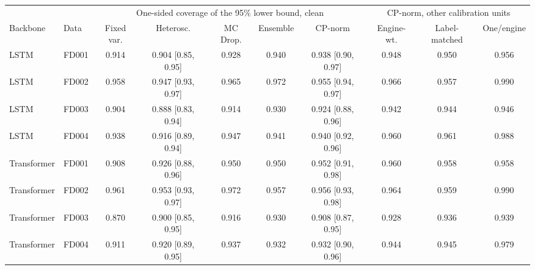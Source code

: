 \begin{tabular}{llcccccccc}\toprule
 & & \multicolumn{5}{c}{One-sided coverage of the 95\% lower bound, clean} & \multicolumn{3}{c}{CP-norm, other calibration units} \\
\cmidrule(lr){3-7}\cmidrule(lr){8-10}
Backbone & Data & Fixed var. & Heterosc. & MC Drop. & Ensemble & CP-norm & Engine-wt. & Label-matched & One/engine \\ \midrule
LSTM & FD001 & 0.914 & 0.904 [0.85, 0.95] & 0.928 & 0.940 & 0.938 [0.90, 0.97] & 0.948 & 0.950 & 0.956 \\
LSTM & FD002 & 0.958 & 0.947 [0.93, 0.97] & 0.965 & 0.972 & 0.955 [0.94, 0.97] & 0.966 & 0.957 & 0.990 \\
LSTM & FD003 & 0.904 & 0.888 [0.83, 0.94] & 0.914 & 0.930 & 0.924 [0.88, 0.96] & 0.942 & 0.944 & 0.946 \\
LSTM & FD004 & 0.938 & 0.916 [0.89, 0.94] & 0.947 & 0.941 & 0.940 [0.92, 0.96] & 0.960 & 0.961 & 0.988 \\
Transformer & FD001 & 0.908 & 0.926 [0.88, 0.96] & 0.950 & 0.950 & 0.952 [0.91, 0.98] & 0.960 & 0.958 & 0.958 \\
Transformer & FD002 & 0.961 & 0.953 [0.93, 0.97] & 0.972 & 0.957 & 0.956 [0.93, 0.98] & 0.964 & 0.959 & 0.990 \\
Transformer & FD003 & 0.870 & 0.900 [0.85, 0.95] & 0.916 & 0.930 & 0.908 [0.87, 0.95] & 0.928 & 0.936 & 0.939 \\
Transformer & FD004 & 0.911 & 0.920 [0.89, 0.95] & 0.937 & 0.932 & 0.932 [0.90, 0.96] & 0.944 & 0.945 & 0.979 \\
\bottomrule\end{tabular}
